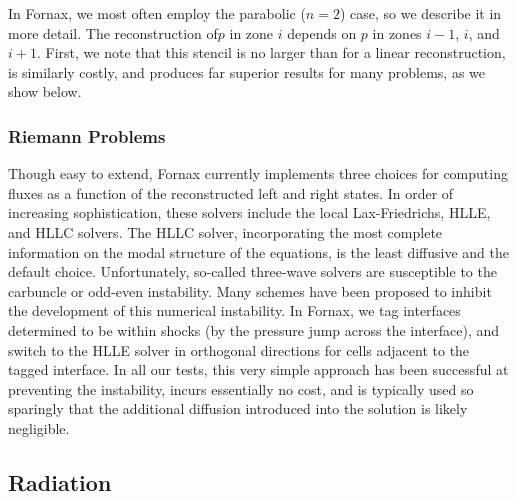 \documentclass[iop]{emulateapj}
\begin{document}
In Fornax, we most often employ the parabolic ($n=2$) case, so we describe it in more detail.  The reconstruction of$p$ in zone $i$ depends on $p$ in zones $i-1$, $i$, and $i+1$.  First, we note that this stencil is no larger than for a linear reconstruction, is similarly costly, and produces far superior results for many problems, as we show below.

\subsubsection{Riemann Problems}
Though easy to extend, Fornax currently implements three choices for computing fluxes as a function of the reconstructed left and right states.  In order of increasing sophistication, these solvers include the local Lax-Friedrichs, HLLE, and HLLC solvers.  The HLLC solver, incorporating the most complete information on the modal structure of the equations, is the least diffusive and the default choice.  Unfortunately, so-called three-wave solvers are susceptible to the carbuncle or odd-even instability.  Many schemes have been proposed to inhibit the development of this numerical instability.  In Fornax, we tag interfaces determined to be within shocks (by the pressure jump across the interface), and switch to the HLLE solver in orthogonal directions for cells adjacent to the tagged interface.  In all our tests, this very simple approach has been successful at preventing the instability, incurs essentially no cost, and is typically used so sparingly that the additional diffusion introduced into the solution is likely negligible.

\subsection{Radiation}
\end{document}
